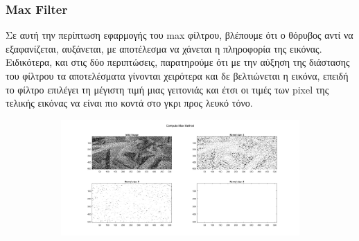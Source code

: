 \documentclass{article}
\begin{document}
\subsubsection*{Max Filter}
	Σε αυτή την περίπτωση εφαρμογής του max φίλτρου, βλέπουμε ότι ο θόρυβος αντί να εξαφανίζεται, αυξάνεται, με αποτέλεσμα να χάνεται η πληροφορία της εικόνας. Ειδικότερα, και στις δύο περιπτώσεις, παρατηρούμε ότι με την αύξηση της διάστασης του φίλτρου τα αποτελέσματα γίνονται χειρότερα και δε βελτιώνεται η εικόνα, επειδή το φίλτρο επιλέγει τη μέγιστη τιμή μιας γειτονιάς και έτσι οι τιμές των pixel της τελικής εικόνας να είναι πιο κοντά στο γκρι προς λευκό τόνο.\\
	
	\begin{figure}[h!]
		\centering
		\begin{subfigure}[t]{0.5\textwidth}
			\centering
			\includegraphics[height=\linewidth, width=\linewidth]{./output_images/img_noisy_1_max.jpg}
		\end{subfigure}%
		~
		\begin{subfigure}[t]{0.5\textwidth}
			\centering

\end{subfigure}
\end{figure}
\end{document}
